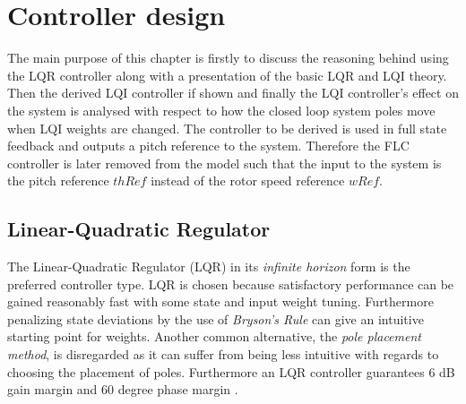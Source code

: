\section{Controller design} \label{sec:ctrl-design}
The main purpose of this chapter is firstly to discuss the reasoning behind using the LQR controller along with a presentation of the basic LQR and LQI theory. Then the derived LQI controller if shown and finally the LQI controller's effect on the system is analysed with respect to how the closed loop system poles move when LQI weights are changed. The controller to be derived is used in full state feedback and outputs a pitch reference to the system. Therefore the FLC controller is later removed from the model such that the input to the system is the pitch reference $ thRef $ instead of the rotor speed reference $ wRef $.

\subsection{Linear-Quadratic Regulator} \label{sec:ctrl_lqr}
The Linear-Quadratic Regulator (LQR) in its \textit{infinite horizon} form is the preferred controller type. LQR is chosen because satisfactory performance can be gained reasonably fast with some state and input weight tuning. Furthermore penalizing state deviations by the use of \textit{Bryson's Rule} can give an intuitive starting point for weights. Another common alternative, the \textit{pole placement method}, is disregarded as it can suffer from being less intuitive with regards to choosing the placement of poles. Furthermore an LQR controller guarantees 6 dB gain margin and 60 degree phase margin \cite{Doyle1978}. 

